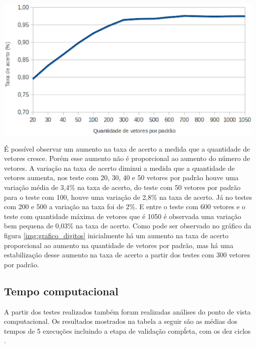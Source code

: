 \begin{center}
	\includegraphics[scale=0.5]{graficos/grafico}
	\label{img:grafico_digitos}
\end{center}

É possível observar um aumento na taxa de acerto a medida que a quantidade de vetores cresce. Porém esse aumento não é proporcional ao aumento do número de vetores. A variação na taxa de acerto diminui a medida que a quantidade de vetores aumenta, nos teste com 20, 30, 40 e 50 vetores por padrão houve uma variação média de 3,4\% na taxa de acerto, do teste com 50 vetores por padrão para o teste com 100, houve uma variação de 2,8\% na taxa de acerto. Já no testes com 200 e 500 a variação na taxa foi de 2\%. E entre o teste com 600 vetores e o teste com quantidade máxima de vetores que é 1050 é observada uma variação bem pequena de 0,03\% na taxa de acerto.
Como pode ser observado no gráfico da figura \ref{img:grafico_digitos} inicialmente há um aumento na taxa de acerto proporcional ao aumento na quantidade de vetores por padrão, mas há uma estabilização desse aumento na taxa de acerto a partir dos testes com 300 vetores por padrão.

\subsection{Tempo computacional}
A partir dos testes realizados também foram realizadas análises do ponto de vista computacional.
Os resultados mostrados na tabela a seguir são as médias dos tempos de 5 execuções incluindo a etapa de validação compĺeta, com os dez ciclos .

